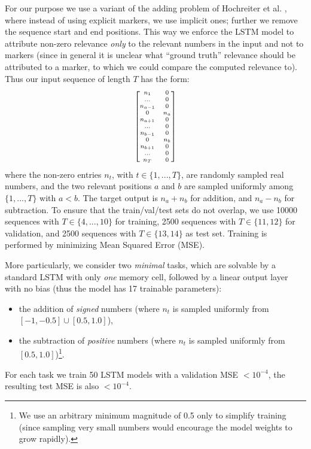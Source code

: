 \documentclass[runningheads]{llncs}
\begin{document}
For our purpose we use a variant of the adding problem of Hochreiter et al. \cite{Arr:Hochreiter:97e}, where instead of using explicit markers, we use implicit ones; further we remove the sequence start and end positions. 
This way we enforce the LSTM model to attribute non-zero relevance {\it only} to the relevant numbers in the input and not to markers (since in general it is unclear what ``ground truth'' relevance should be attributed to a marker, to which we could compare the computed relevance to).
Thus our input sequence of length $T$ has the form:
\begin{equation*}
\scriptsize
   \begin{bmatrix} 
   n_{1} 	& 0  	\\
   ...    	& 0 	\\
   n_{a-1}	& 0  	\\
   0     	& n_a  	\\
   n_{a+1} 	& 0 	\\
   ... 		& 0 	\\
   n_{b-1}	& 0 	\\
   0     	& n_b  	\\
   n_{b+1} 	& 0 	\\
   ... 		& 0 	\\
   n_{T}	& 0 	\\
   \end{bmatrix}  
\end{equation*}
where the non-zero entries  $n_t$, with $t \in \{1,...,T\}$, are randomly sampled real numbers, and the two relevant positions $a$ and $b$ are sampled uniformly among $\{1,...,T\}$ with $a<b$.
The target output is  $n_a+n_b$ for addition, and $n_a-n_b$ for subtraction.
To ensure that the train/val/test sets do not overlap, we use 10000 sequences with $T \in \{4,...,10\}$ for training, 2500 sequences with $T \in \{11,12\}$ for validation, and 2500 sequences with $T \in \{13,14\}$ as test set. Training is performed by minimizing Mean Squared Error (MSE).

More particularly, we consider two {\it minimal} tasks, which are solvable by a standard LSTM with only {\it one} memory cell, followed by a linear output layer with no  bias (thus the model has 17 trainable parameters):
\begin{itemize}
 \item the addition of {\it signed} numbers (where $n_t$ is sampled uniformly from $[-1,-0.5] \cup [0.5, 1.0]$),
 \item the subtraction of {\it positive} numbers (where $n_t$ is sampled uniformly from $[0.5, 1.0]$)\footnote{We use an arbitrary minimum magnitude of 0.5 only to simplify training (since sampling very small numbers would encourage the model weights to grow rapidly).}.
\end{itemize}
For each task we train 50 LSTM models with a validation MSE $<10^{-4}$, the resulting test MSE is also $<10^{-4}$.
\end{document}

